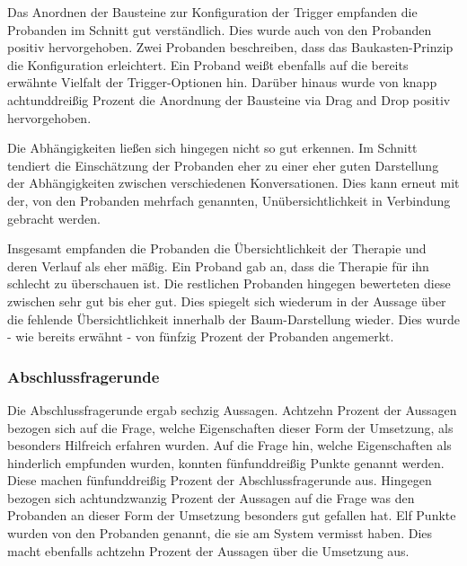Das Anordnen der Bausteine zur Konfiguration der Trigger empfanden die Probanden im Schnitt gut verständlich. Dies wurde auch von den Probanden positiv hervorgehoben. Zwei Probanden beschreiben, dass das Baukasten-Prinzip die Konfiguration erleichtert. Ein Proband weißt ebenfalls auf die bereits erwähnte Vielfalt der Trigger-Optionen hin. Darüber hinaus wurde von knapp achtunddreißig Prozent die Anordnung der Bausteine via Drag and Drop positiv hervorgehoben.

Die Abhängigkeiten ließen sich hingegen nicht so gut erkennen. Im Schnitt tendiert die Einschätzung der Probanden eher zu einer eher guten Darstellung der Abhängigkeiten zwischen verschiedenen Konversationen. Dies kann erneut mit der, von den Probanden mehrfach genannten, Unübersichtlichkeit in Verbindung gebracht werden. 

Insgesamt empfanden die Probanden die Übersichtlichkeit der Therapie und deren Verlauf als eher mäßig. Ein Proband gab an, dass die Therapie für ihn schlecht zu überschauen ist. Die restlichen Probanden hingegen bewerteten diese zwischen sehr gut bis eher gut. Dies spiegelt sich wiederum in der Aussage über die fehlende Übersichtlichkeit innerhalb der Baum-Darstellung wieder. Dies wurde - wie bereits erwähnt - von fünfzig Prozent der Probanden angemerkt. 

\subsubsection{Abschlussfragerunde}
Die Abschlussfragerunde ergab sechzig Aussagen. Achtzehn Prozent der Aussagen bezogen sich auf die Frage, welche Eigenschaften dieser Form der Umsetzung, als besonders Hilfreich erfahren wurden. Auf die Frage hin, welche Eigenschaften als hinderlich empfunden wurden, konnten fünfunddreißig Punkte genannt werden. Diese machen fünfunddreißig Prozent der Abschlussfragerunde aus. Hingegen bezogen sich achtundzwanzig Prozent der Aussagen auf die Frage was den Probanden an dieser Form der Umsetzung besonders gut gefallen hat. Elf Punkte wurden von den Probanden genannt, die sie am System vermisst haben. Dies macht ebenfalls achtzehn Prozent der Aussagen über die Umsetzung aus. 

